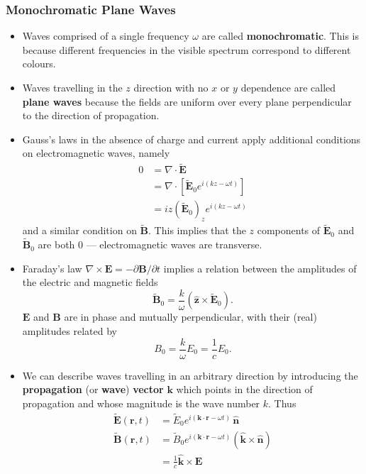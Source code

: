 \documentclass{article}
\renewcommand{\vec}[1]{\boldsymbol{\mathbf{#1}}}
\newcommand{\tvec}[1]{\tilde{\vec{#1}}}
\newcommand{\uvec}[1]{\hat{\vec{#1}}}
\begin{document}
\subsubsection{Monochromatic Plane Waves}

\begin{itemize}
  \item Waves comprised of a single frequency $\omega$ are called \textbf{monochromatic}. This is because different frequencies in the visible spectrum correspond to different colours.

  \item Waves travelling in the $z$ direction with no $x$ or $y$ dependence are called \textbf{plane waves} because the fields are uniform over every plane perpendicular to the direction of propagation.

  \item Gauss's laws in the absence of charge and current apply additional conditions on electromagnetic waves, namely \begin{align*}
          0 & = \nabla \cdot \tvec{E}                            \\
            & = \nabla \cdot [\tvec{E}_0 e^{i (k z - \omega t)}] \\
            & = i z (\tvec{E}_0)_z e^{i (k z - \omega t)}
        \end{align*} and a similar condition on $\tvec{B}$. This implies that the $z$ components of $\tvec{E}_0$ and $\tvec{B}_0$ are both $0$ — electromagnetic waves are transverse.

  \item Faraday's law $\nabla \times \vec{E} = -\partial \vec{B} / \partial t$ implies a relation between the amplitudes of the electric and magnetic fields \[\tvec{B}_0 = \frac{k}{\omega} (\uvec{z} \times \tvec{E}_0).\] $\vec{E}$ and $\vec{B}$ are in phase and mutually perpendicular, with their (real) amplitudes related by \[B_0 = \frac{k}{\omega} E_0 = \frac{1}{c} E_0.\]

  \item We can describe waves travelling in an arbitrary direction by introducing the \textbf{propagation} (or \textbf{wave}) \textbf{vector} $\vec{k}$ which points in the direction of propagation and whose magnitude is the wave number $k$. Thus \begin{align*}
          \tvec{E}(\vec{r}, t) & = \tilde{E}_0 e^{i (\vec{k} \cdot \vec{r} - \omega t)} \,\uvec{n}                 \\
          \tvec{B}(\vec{r}, t) & = \tilde{B}_0 e^{i (\vec{k} \cdot \vec{r} - \omega t)} (\uvec{k} \times \uvec{n}) \\
                               & = \frac{1}{c} \uvec{k} \times \vec{E}
        \end{align*}
\end{itemize}
\end{document}
